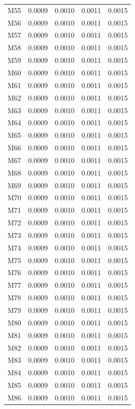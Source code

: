 \begin{longtable}{lrrrr}
M55 & 0.0009 & 0.0010 & 0.0011 & 0.0015 \\
M56 & 0.0009 & 0.0010 & 0.0011 & 0.0015 \\
M57 & 0.0009 & 0.0010 & 0.0011 & 0.0015 \\
M58 & 0.0009 & 0.0010 & 0.0011 & 0.0015 \\
M59 & 0.0009 & 0.0010 & 0.0011 & 0.0015 \\
M60 & 0.0009 & 0.0010 & 0.0011 & 0.0015 \\
M61 & 0.0009 & 0.0010 & 0.0011 & 0.0015 \\
M62 & 0.0009 & 0.0010 & 0.0011 & 0.0015 \\
M63 & 0.0009 & 0.0010 & 0.0011 & 0.0015 \\
M64 & 0.0009 & 0.0010 & 0.0011 & 0.0015 \\
M65 & 0.0009 & 0.0010 & 0.0011 & 0.0015 \\
M66 & 0.0009 & 0.0010 & 0.0011 & 0.0015 \\
M67 & 0.0009 & 0.0010 & 0.0011 & 0.0015 \\
M68 & 0.0009 & 0.0010 & 0.0011 & 0.0015 \\
M69 & 0.0009 & 0.0010 & 0.0011 & 0.0015 \\
M70 & 0.0009 & 0.0010 & 0.0011 & 0.0015 \\
M71 & 0.0009 & 0.0010 & 0.0011 & 0.0015 \\
M72 & 0.0009 & 0.0010 & 0.0011 & 0.0015 \\
M73 & 0.0009 & 0.0010 & 0.0011 & 0.0015 \\
M74 & 0.0009 & 0.0010 & 0.0011 & 0.0015 \\
M75 & 0.0009 & 0.0010 & 0.0011 & 0.0015 \\
M76 & 0.0009 & 0.0010 & 0.0011 & 0.0015 \\
M77 & 0.0009 & 0.0010 & 0.0011 & 0.0015 \\
M78 & 0.0009 & 0.0010 & 0.0011 & 0.0015 \\
M79 & 0.0009 & 0.0010 & 0.0011 & 0.0015 \\
M80 & 0.0009 & 0.0010 & 0.0011 & 0.0015 \\
M81 & 0.0009 & 0.0010 & 0.0011 & 0.0015 \\
M82 & 0.0009 & 0.0010 & 0.0011 & 0.0015 \\
M83 & 0.0009 & 0.0010 & 0.0011 & 0.0015 \\
M84 & 0.0009 & 0.0010 & 0.0011 & 0.0015 \\
M85 & 0.0009 & 0.0010 & 0.0011 & 0.0015 \\
M86 & 0.0009 & 0.0010 & 0.0011 & 0.0015 \\

\end{longtable}

